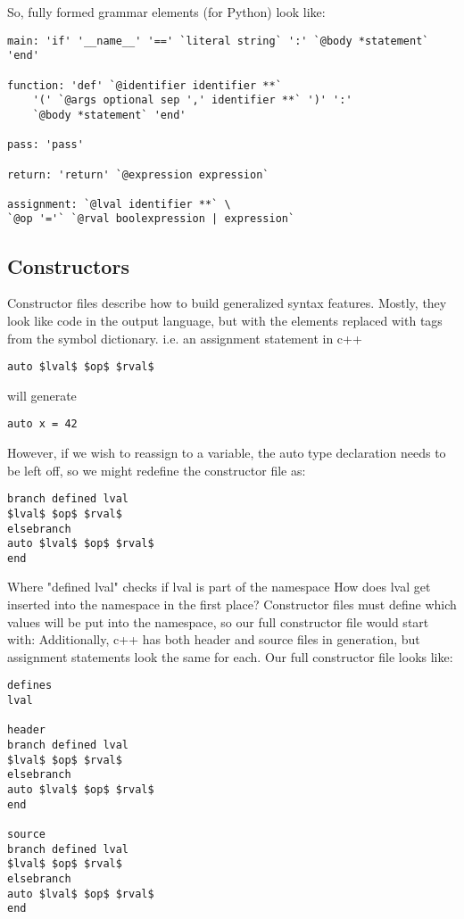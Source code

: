 \documentclass{article}
\begin{document}
So, fully formed grammar elements (for Python) look like:
\begin{verbatim}
main: 'if' '__name__' '==' `literal string` ':' `@body *statement` 'end'

function: 'def' `@identifier identifier **` 
    '(' `@args optional sep ',' identifier **` ')' ':' 
    `@body *statement` 'end' 

pass: 'pass'

return: 'return' `@expression expression`

assignment: `@lval identifier **` \
`@op '='` `@rval boolexpression | expression`
\end{verbatim}

\subsection{Constructors}

Constructor files describe how to build generalized syntax features. Mostly, they look like code in the output language, but with the elements replaced with tags from the symbol dictionary.
i.e. an assignment statement in c++
\lstset{language=c++}
\begin{lstlisting}
auto $lval$ $op$ $rval$
\end{lstlisting}
will generate
\lstset{language=c++}
\begin{lstlisting}
auto x = 42
\end{lstlisting}
However, if we wish to reassign to a variable, the auto type declaration needs to be left off, so we might redefine the constructor file as:
\begin{verbatim}
branch defined lval 
$lval$ $op$ $rval$
elsebranch
auto $lval$ $op$ $rval$
end
\end{verbatim}
Where "defined lval" checks if lval is part of the namespace
How does lval get inserted into the namespace in the first place?
Constructor files must define which values will be put into the namespace, so our full constructor file would start with:
Additionally, c++ has both header and source files in generation, but assignment statements look the same for each.
Our full constructor file looks like:

\begin{verbatim}
defines
lval

header
branch defined lval 
$lval$ $op$ $rval$
elsebranch
auto $lval$ $op$ $rval$
end

source
branch defined lval 
$lval$ $op$ $rval$
elsebranch
auto $lval$ $op$ $rval$
end
\end{verbatim}
\end{document}
